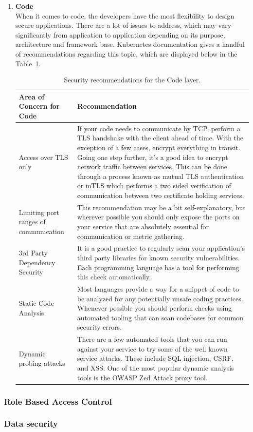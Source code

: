 \begin{enumerate}
\item \textbf{Code} \\
When it comes to code, the developers have the most flexibility to design secure applications. There are a lot of issues to address, which may vary significantly from application to application depending on its purpose, architecture and framework base. Kubernetes documentation gives a handful of recommendations regarding this topic, which are displayed below in the Table~\ref{tab:code-security-recommendations}.

\begin{table}[H]
    \begin{center}
        \begin{tabular}{ | p{} | p{} | } 
        \hline
        \textbf{Area of Concern for Code} & \textbf{Recommendation} \\ 
        \hline
        Access over TLS only & If your code needs to communicate by TCP, perform a TLS handshake with the client ahead of time. With the exception of a few cases, encrypt everything in transit. Going one step further, it's a good idea to encrypt network traffic between services. This can be done through a process known as mutual TLS authentication or mTLS which performs a two sided verification of communication between two certificate holding services. \\ 
        \hline
        Limiting port ranges of communication & This recommendation may be a bit self-explanatory, but wherever possible you should only expose the ports on your service that are absolutely essential for communication or metric gathering. \\ 
        \hline
        3rd Party Dependency Security & It is a good practice to regularly scan your application's third party libraries for known security vulnerabilities. Each programming language has a tool for performing this check automatically. \\
        \hline
        Static Code Analysis & Most languages provide a way for a snippet of code to be analyzed for any potentially unsafe coding practices. Whenever possible you should perform checks using automated tooling that can scan codebases for common security errors. \\
        \hline
        Dynamic probing attacks & There are a few automated tools that you can run against your service to try some of the well known service attacks. These include SQL injection, CSRF, and XSS. One of the most popular dynamic analysis tools is the OWASP Zed Attack proxy tool. \\
        \hline
        \end{tabular}
    \end{center}
    \caption{Security recommendations for the Code layer.}
    \label{tab:code-security-recommendations}
\end{table}
                      
\end{enumerate}

\subsubsection*{Role Based Access Control}

\subsubsection*{Data security}